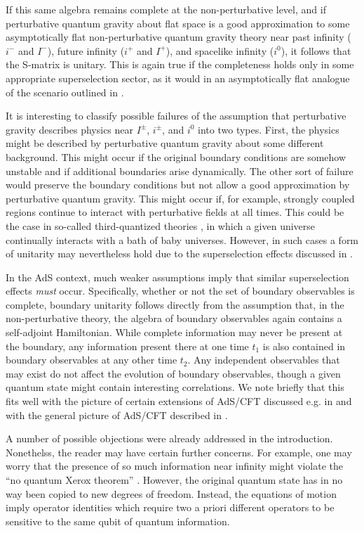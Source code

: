 \documentclass[12pt,onecolumn,eqsecnum,aps,prd,nofootinbib]{revtex4}
\begin{document}
If this same algebra remains complete at the non-perturbative level, and  if perturbative quantum gravity about flat space is a
good approximation to some asymptotically flat non-perturbative
quantum gravity theory near past infinity ($i^-$ and $I^-$), future
infinity ($i^+$ and $I^+$), and spacelike infinity ($i^0$), it
follows  that the S-matrix is unitary.  This is again true if the completeness holds only in some appropriate superselection sector, as it would in an asymptotically flat analogue of the scenario outlined in \cite{BadH}.

 It is interesting to
classify possible failures of the assumption that perturbative gravity describes physics near $I^\pm$, $i^\pm$, and $i^0$  into two types.  First, the
physics might be described by perturbative quantum gravity about
some different background.  This might occur if the original
boundary conditions are somehow unstable and if additional
boundaries arise dynamically.  The other sort of failure would
preserve the boundary conditions but not allow a good approximation
by perturbative quantum gravity.  This might occur if, for example,
strongly coupled regions continue to interact with perturbative
fields at all times.  This could be the case in so-called
third-quantized theories \cite{3Q}, in which a given universe
continually interacts with a bath of baby universes.  However, in
such cases a form of unitarity may nevertheless hold due to the
superselection effects discussed in \cite{3QSS}.

In the AdS context, much weaker assumptions imply that similar
superselection effects {\em must} occur.  Specifically, whether or
not the set of boundary observables is complete, boundary unitarity
follows directly from the assumption that, in the non-perturbative
theory, the
algebra of boundary observables again contains a self-adjoint Hamiltonian.
While complete information may
never be present at the boundary, any information present there at one
time $t_1$ is also contained in boundary observables at any
other time $t_2$.  Any independent observables that may exist do not affect the evolution of boundary observables, though a
given quantum state might contain interesting correlations.  We note briefly that this fits well with the picture of certain extensions of AdS/CFT discussed e.g. in
\cite{Maldacena,FHMMRS} and with the general picture of AdS/CFT described in \cite{BadH}.

A number of possible objections were already addressed in the introduction.  Nonethelss, the reader may have certain further concerns.  For example, one may worry that the presence of so much information near
infinity might  violate the ``no quantum Xerox theorem'' \cite{noXerox}.   However, the original quantum state has in no way
been copied to new degrees of freedom.  Instead, the equations of
motion imply operator identities which require two a priori
different operators to be sensitive to the same qubit of quantum information.
\end{document}
